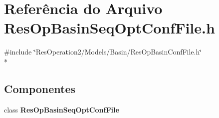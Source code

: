 \section{Referência do Arquivo Res\+Op\+Basin\+Seq\+Opt\+Conf\+File.\+h}
\label{_res_op_basin_seq_opt_conf_file_8h}
{\ttfamily \#include \char`\"{}Res\+Operation2/\+Models/\+Basin/\+Res\+Op\+Basin\+Conf\+File.\+h\char`\"{}}\\*
\subsection*{Componentes}
\begin{DoxyCompactItemize}
\item 
class {\bf Res\+Op\+Basin\+Seq\+Opt\+Conf\+File}
\end{DoxyCompactItemize}
